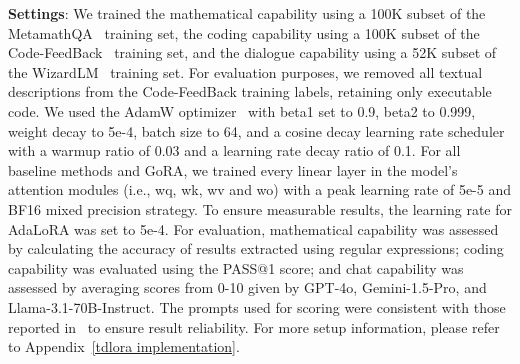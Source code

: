 \textbf{Settings}: We trained the mathematical capability using a 100K subset of the MetamathQA~\citep{yu2023metamath} training set, the coding capability using a 100K subset of the Code-FeedBack~\citep{zheng2024opencodeinterpreter} training set, and the dialogue capability using a 52K subset of the WizardLM~\citep{xu2024wizardlm} training set. For evaluation purposes, we removed all textual descriptions from the Code-FeedBack training labels, retaining only executable code. We used the AdamW optimizer~\citep{loshchilov2017decoupled} with beta1 set to 0.9, beta2 to 0.999, weight decay to 5e-4, batch size to 64, and a cosine decay learning rate scheduler with a warmup ratio of 0.03 and a learning rate decay ratio of 0.1. For all baseline methods and GoRA, we trained every linear layer in the model's attention modules (i.e., wq, wk, wv and wo) with a peak learning rate of 5e-5 and BF16 mixed precision strategy. To ensure measurable results, the learning rate for AdaLoRA was set to 5e-4. For evaluation, mathematical capability was assessed by calculating the accuracy of results extracted using regular expressions; coding capability was evaluated using the PASS@1 score; and chat capability was assessed by averaging scores from 0-10 given by GPT-4o, Gemini-1.5-Pro, and Llama-3.1-70B-Instruct. The prompts used for scoring were consistent with those reported in~\citep{zheng2023mtbench} to ensure result reliability. For more setup information, please refer to Appendix~\ref{tdlora implementation}.

